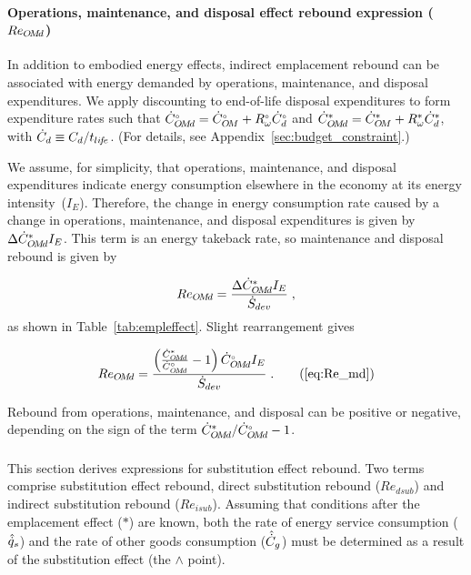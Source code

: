 \paragraph{Operations, maintenance, and disposal effect rebound expression ($Re_{O\!M\!d}$)} 
\label{sec:Re_OMd}

In addition to embodied energy effects, 
indirect emplacement rebound 
can be associated with energy demanded by
operations, maintenance, and disposal expenditures.
We apply discounting to end-of-life disposal expenditures
to form expenditure rates such that 
${}{\dot{C}}^{\scriptscriptstyle \circ}_{O\!M\!d} = {}{\dot{C}}^{\scriptscriptstyle \circ}_{O\!M} + {}{R}^{\scriptscriptstyle \circ}_\omega {}{\dot{C}}^{\scriptscriptstyle \circ}_d$
and
${\dot{C}}^*_{O\!M\!d} = {\dot{C}}^*_{O\!M} + {R}^*_\omega {\dot{C}}^*_d$,
with $\dot{C}_d \equiv C_d / t_{li\!f\!e}$.
(For details, see Appendix~\ref{sec:budget_constraint}.)

We assume, for simplicity, that operations, maintenance, and disposal expenditures 
indicate energy consumption
elsewhere in the economy at its energy intensity~($I_E$).
Therefore, the change in energy consumption rate caused by a change in 
operations, maintenance, and disposal expenditures
is given by $\Delta {\dot{C}}^*_{O\!M\!d} I_E$.
This term is an energy takeback rate,
so maintenance and disposal rebound is given by

\begin{equation} \label{eq:Re_md_def}
  Re_{O\!M\!d} = \frac{\Delta {\dot{C}}^*_{O\!M\!d} I_E}{\dot{S}_{dev}} \; ,
\end{equation}
%
as shown in Table~\ref{tab:empleffect}.
Slight rearrangement gives

\begin{equation}
  Re_{\omd} = \ReOMdeqn{} \; . \tag{\ref{eq:Re_md}}
\end{equation}

Rebound from operations, maintenance, and disposal can be positive or negative,
depending on the sign of the term ${\dot{C}}^*_{O\!M\!d}/{}{\dot{C}}^{\scriptscriptstyle \circ}_{O\!M\!d} - 1$.


\subsubsection{\Subeffect{}} 
\label{sec:Re_sub}

This section derives expressions for substitution effect rebound.
Two terms comprise substitution effect rebound,
direct substitution rebound ($Re_{dsub}$) and
indirect substitution rebound ($Re_{isub}$).
Assuming that conditions after the emplacement effect ($*$) are known, 
both the 
rate of energy service consumption ($\hat{\dot{q}}_s$) and
the rate of other goods consumption ($\hat{\dot{C}}_g$) 
must be determined as a result of the substitution effect
(the $\wedge$ point).

